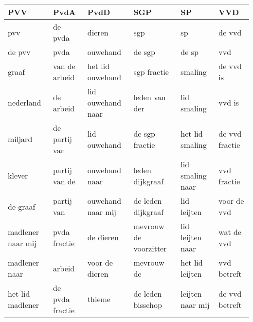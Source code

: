\begin{tabular}{llllll}
\toprule
               PVV &             PvdA &               PvdD &                    SGP &                SP &             VVD \\
\midrule
               pvv &          de pvda &             dieren &                    sgp &                sp &          de vvd \\
            de pvv &             pvda &           ouwehand &                 de sgp &             de sp &             vvd \\
             graaf &    van de arbeid &   het lid ouwehand &            sgp fractie &           smaling &       de vvd is \\
         nederland &        de arbeid &  lid ouwehand naar &          leden van der &       lid smaling &          vvd is \\
           miljard &    de partij van &       lid ouwehand &         de sgp fractie &   het lid smaling &  de vvd fractie \\
            klever &    partij van de &      ouwehand naar &        leden dijkgraaf &  lid smaling naar &     vvd fractie \\
          de graaf &       partij van &  ouwehand naar mij &     de leden dijkgraaf &       lid leijten &     voor de vvd \\
 madlener naar mij &     pvda fractie &          de dieren &  mevrouw de voorzitter &  lid leijten naar &      wat de vvd \\
     madlener naar &           arbeid &     voor de dieren &             mevrouw de &   het lid leijten &     vvd betreft \\
  het lid madlener &  de pvda fractie &             thieme &      de leden bisschop &  leijten naar mij &  de vvd betreft \\
\bottomrule
\end{tabular}
